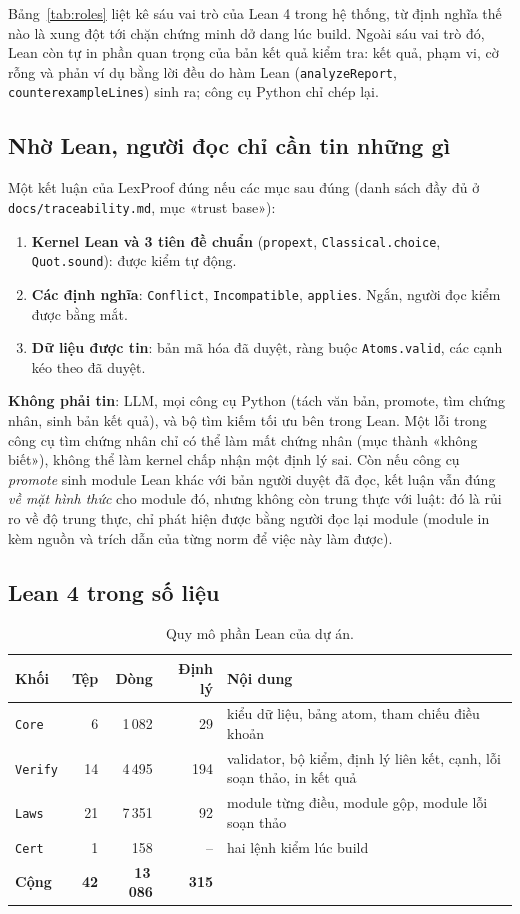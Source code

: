 \documentclass[12pt,a4paper]{article}
\newcommand{\code}[1]{\texttt{#1}}
\begin{document}
Bảng~\ref{tab:roles} liệt kê sáu vai trò của Lean 4 trong hệ thống, từ định nghĩa thế nào là xung đột tới chặn chứng minh dở
dang lúc build. Ngoài sáu vai trò đó, Lean còn tự in phần quan trọng của bản kết quả kiểm tra: kết quả, phạm vi, cờ rỗng và phản ví dụ bằng lời đều do hàm
Lean (\code{analyzeReport}, \code{counterexampleLines}) sinh ra; công cụ Python chỉ chép lại.

\subsection{Nhờ Lean, người đọc chỉ cần tin những gì}

Một kết luận của LexProof đúng nếu các mục sau đúng (danh sách đầy đủ ở \code{docs/traceability.md}, mục «trust base»):
\begin{enumerate}
  \item \textbf{Kernel Lean và 3 tiên đề chuẩn} (\code{propext}, \code{Classical.choice}, \code{Quot.sound}): được kiểm tự động.
  \item \textbf{Các định nghĩa}: \code{Conflict}, \code{Incompatible}, \code{applies}. Ngắn, người đọc kiểm được bằng mắt.
  \item \textbf{Dữ liệu được tin}: bản mã hóa đã duyệt, ràng buộc \code{Atoms.valid}, các cạnh kéo theo đã duyệt.
\end{enumerate}
\textbf{Không phải tin}: LLM, mọi công cụ Python (tách văn bản, promote, tìm chứng nhân, sinh bản kết quả), và bộ tìm kiếm tối ưu
bên trong Lean. Một lỗi trong công cụ tìm chứng nhân chỉ có thể làm mất chứng nhân (mục thành «không biết»), không thể làm kernel
chấp nhận một định lý sai. Còn nếu công cụ \emph{promote} sinh module Lean khác với bản người duyệt đã đọc, kết luận vẫn đúng
\emph{về mặt hình thức} cho module đó, nhưng không còn trung thực với luật: đó là rủi ro về độ trung thực, chỉ phát hiện được
bằng người đọc lại module (module in kèm nguồn và trích dẫn của từng norm để việc này làm được).

\subsection{Lean 4 trong số liệu}

\begin{table}[H]
\centering\small
\caption{Quy mô phần Lean của dự án.}
\label{tab:leansize}
\begin{tabular}{lrrrl}
\toprule
Khối & Tệp & Dòng & Định lý & Nội dung\\
\midrule
\code{Core} & 6 & 1\,082 & 29 & kiểu dữ liệu, bảng atom, tham chiếu điều khoản\\
\code{Verify} & 14 & 4\,495 & 194 & validator, bộ kiểm, định lý liên kết, cạnh, lỗi soạn thảo, in kết quả\\
\code{Laws} & 21 & 7\,351 & 92 & module từng điều, module gộp, module lỗi soạn thảo\\
\code{Cert} & 1 & 158 & -- & hai lệnh kiểm lúc build\\
\midrule
\textbf{Cộng} & \textbf{42} & \textbf{13\,086} & \textbf{315} & \\
\bottomrule
\end{tabular}
\end{table}
\end{document}
